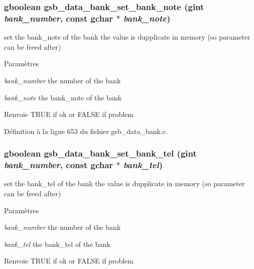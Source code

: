 \subsubsection[{gsb\_\-data\_\-bank\_\-set\_\-bank\_\-note}]{\setlength{\rightskip}{0pt plus 5cm}gboolean gsb\_\-data\_\-bank\_\-set\_\-bank\_\-note (gint {\em bank\_\-number}, \/  const gchar $\ast$ {\em bank\_\-note})}\label{gsb__data__bank_8c_af043f3823b95d7ea72402a5883411032}
set the bank\_\-note of the bank the value is dupplicate in memory (so parameter can be freed after)


\begin{DoxyParams}{Paramètres}
\item[{\em bank\_\-number}]the number of the bank \item[{\em bank\_\-note}]the bank\_\-note of the bank\end{DoxyParams}
\begin{DoxyReturn}{Renvoie}
TRUE if ok or FALSE if problem 
\end{DoxyReturn}


Définition à la ligne 653 du fichier gsb\_\-data\_\-bank.c.

\subsubsection[{gsb\_\-data\_\-bank\_\-set\_\-bank\_\-tel}]{\setlength{\rightskip}{0pt plus 5cm}gboolean gsb\_\-data\_\-bank\_\-set\_\-bank\_\-tel (gint {\em bank\_\-number}, \/  const gchar $\ast$ {\em bank\_\-tel})}\label{gsb__data__bank_8c_aeee694aad5e5d3b0459de034d1692f08}
set the bank\_\-tel of the bank the value is dupplicate in memory (so parameter can be freed after)


\begin{DoxyParams}{Paramètres}
\item[{\em bank\_\-number}]the number of the bank \item[{\em bank\_\-tel}]the bank\_\-tel of the bank\end{DoxyParams}
\begin{DoxyReturn}{Renvoie}
TRUE if ok or FALSE if problem 
\end{DoxyReturn}


